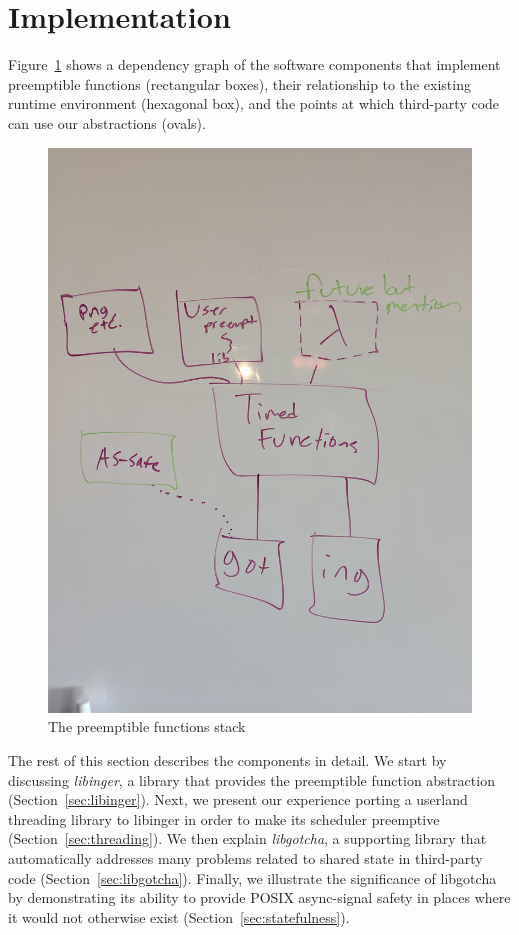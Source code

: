 \section{Implementation}

Figure~\ref{fig:architecture} shows a dependency graph of the software
components that implement preemptible functions (rectangular boxes), their
relationship to the existing
runtime environment (hexagonal box), and the points at which third-party code can use
our abstractions (ovals).

\begin{figure}
\includegraphics[width=\columnwidth]{figs/architecture}
\caption{The preemptible functions stack}
\label{fig:architecture}
\end{figure}

The rest of this section describes the components in detail.  We start by discussing
\textit{libinger}, a library that provides the preemptible function abstraction
(Section~\ref{sec:libinger}).  Next, we present our experience porting a userland
threading library to libinger in order to make its scheduler preemptive
(Section~\ref{sec:threading}).  We then explain \textit{libgotcha}, a supporting
library that automatically addresses many problems related to shared state in
third-party code (Section~\ref{sec:libgotcha}).  Finally, we illustrate the
significance of libgotcha by demonstrating its ability to provide POSIX async-signal
safety in places where it would not otherwise exist (Section~\ref{sec:statefulness}).




